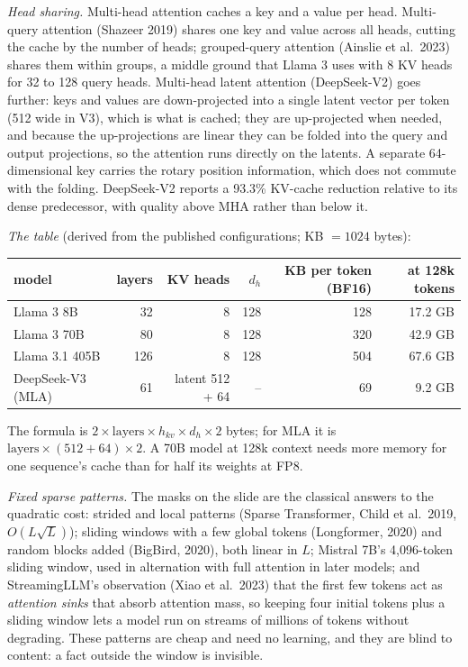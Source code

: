 \documentclass[11pt,letterpaper]{article}
\begin{document}
\emph{Head sharing.} Multi-head attention caches a key and a value per head. Multi-query attention (Shazeer 2019) shares one key and value across all heads, cutting the cache by the number of heads; grouped-query attention (Ainslie et al.\ 2023) shares them within groups, a middle ground that Llama 3 uses with 8 KV heads for 32 to 128 query heads. Multi-head latent attention (DeepSeek-V2) goes further: keys and values are down-projected into a single latent vector per token (512 wide in V3), which is what is cached; they are up-projected when needed, and because the up-projections are linear they can be folded into the query and output projections, so the attention runs directly on the latents. A separate 64-dimensional key carries the rotary position information, which does not commute with the folding. DeepSeek-V2 reports a 93.3\% KV-cache reduction relative to its dense predecessor, with quality above MHA rather than below it.

\emph{The table} (derived from the published configurations; KB $=1024$ bytes):
\begin{center}\small
\begin{tabular}{@{}lrrrrr@{}}
\toprule
model & layers & KV heads & $d_h$ & KB per token (BF16) & at 128k tokens\\
\midrule
Llama 3 8B & 32 & 8 & 128 & 128 & 17.2 GB\\
Llama 3 70B & 80 & 8 & 128 & 320 & 42.9 GB\\
Llama 3.1 405B & 126 & 8 & 128 & 504 & 67.6 GB\\
DeepSeek-V3 (MLA) & 61 & latent 512 + 64 & -- & 69 & 9.2 GB\\
\bottomrule
\end{tabular}
\end{center}
The formula is $2\times\text{layers}\times h_{kv}\times d_h\times2$ bytes; for MLA it is $\text{layers}\times(512+64)\times2$. A 70B model at 128k context needs more memory for one sequence's cache than for half its weights at FP8.

\emph{Fixed sparse patterns.} The masks on the slide are the classical answers to the quadratic cost: strided and local patterns (Sparse Transformer, Child et al.\ 2019, $O(L\sqrt L)$); sliding windows with a few global tokens (Longformer, 2020) and random blocks added (BigBird, 2020), both linear in $L$; Mistral 7B's 4,096-token sliding window, used in alternation with full attention in later models; and StreamingLLM's observation (Xiao et al.\ 2023) that the first few tokens act as \emph{attention sinks} that absorb attention mass, so keeping four initial tokens plus a sliding window lets a model run on streams of millions of tokens without degrading. These patterns are cheap and need no learning, and they are blind to content: a fact outside the window is invisible.
\end{document}
